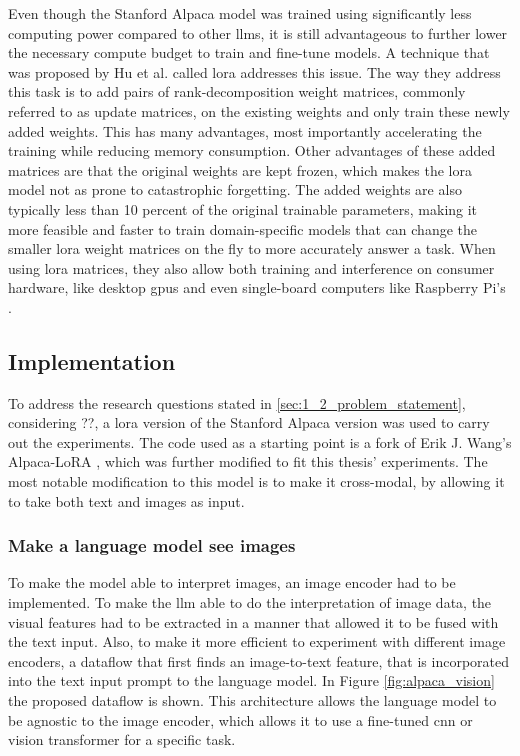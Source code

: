         Even though the Stanford Alpaca model was trained using significantly less computing power compared to other \glspl{llm}, it is still advantageous to further lower the necessary compute budget to train and fine-tune models. A technique that was proposed by Hu et al. called \gls{lora} \cite{huLoRALowRankAdaptation2021} addresses this issue. The way they address this task is to add pairs of rank-decomposition weight matrices, commonly referred to as update matrices, on the existing weights and only train these newly added weights. This has many advantages, most importantly accelerating the training while reducing memory consumption. Other advantages of these added matrices are that the original weights are kept frozen, which makes the \gls{lora} model not as prone to catastrophic forgetting. The added weights are also typically less than 10 percent of the original trainable parameters, making it more feasible and faster to train domain-specific models that can change the smaller \gls{lora} weight matrices on the fly to more accurately answer a task. When using \gls{lora} matrices, they also allow both training and interference on consumer hardware, like desktop \glspl{gpu} and even single-board computers like Raspberry Pi's \cite{artemandreenko[@miolini]VeSucefullyRunned2023}. 


        \subsection{Implementation}
        To address the research questions stated in \ref{sec:1_2_problem_statement}, considering ??, a \gls{lora} version of the Stanford Alpaca version was used to carry out the experiments. The code used as a starting point is a fork of Erik J. Wang's Alpaca-LoRA \cite{wangAlpacaLoRA2023}, which was further modified to fit this thesis' experiments. The most notable modification to this model is to make it cross-modal, by allowing it to take both text and images as input.

        \subsubsection{Make a language model see images}
        To make the model able to interpret images, an image encoder had to be implemented. To make the \gls{llm} able to do the interpretation of image data, the visual features had to be extracted in a manner that allowed it to be fused with the text input. Also, to make it more efficient to experiment with different image encoders, a dataflow that first finds an image-to-text feature, that is incorporated into the text input prompt to the language model. In Figure \ref{fig:alpaca_vision} the proposed dataflow is shown. This architecture allows the language model to be agnostic to the image encoder, which allows it to use a fine-tuned \gls{cnn} or vision transformer for a specific task. 

